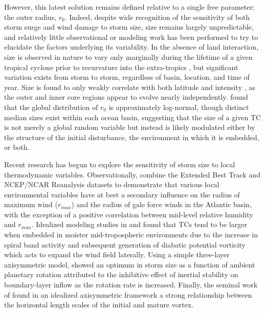\documentclass[12pt]{article}
\begin{document}
However, this latest solution remains defined relative to a single free parameter: the outer radius, $r_0$. Indeed, despite wide recognition of the sensitivity of both storm surge \citep{Irish_Resio_Ratcliff_2008} and wind damage \citep{Iman_Johnson_Watson_2005} to storm size, size remains largely unpredictable, and relatively little observational or modeling work has been performed to try to elucidate the factors underlying its variability. In the absence of land interaction, size is observed in nature to vary only marginally during the lifetime of a given tropical cyclone prior to recurvature into the extra-tropics \citep{Merrill_1984, Frank_1977, Chavas_Emanuel_2010, Cheng-Shang_Cheung_Wei-Ting_Elsberry_2010}, but significant variation exists from storm to storm, regardless of basin, location, and time of year.  Size is found to only weakly correlate with both latitude and intensity \citep{Merrill_1984, Weatherford_Gray_1988, Chavas_Emanuel_2010}, as the outer and inner core regions appear to evolve nearly independently.  \cite{Chavas_Emanuel_2010} found that the global distribution of $r_0$ is approximately log-normal, though distinct median sizes exist within each ocean basin, suggesting that the size of a given TC is not merely a global random variable but instead is likely modulated either by the structure of the initial disturbance, the environment in which it is embedded, or both.

Recent research has begun to explore the sensitivity of storm size to local thermodynamic variables. Observationally, \cite{Quiring_Schumacher_Labosier_Zhu_2011} combine the Extended Best Track and NCEP/NCAR Reanalysis datasets to demonstrate that various local environmental variables have at best a secondary influence on the radius of maximum wind ($r_{max}$) and the radius of gale force winds in the Atlantic basin, with the exception of a positive correlation between mid-level relative humidity and $r_{max}$.  Idealized modeling studies in \cite{Hill_Lackmann_2009} and \cite{Xu_Wang_2010} found that TCs tend to be larger when embedded in moister mid-tropospheric environments due to the increase in spiral band activity and subsequent generation of diabatic potential vorticity which acts to expand the wind field laterally. Using a simple three-layer axisymmetric model, \cite{Smith_Schmidt_Montgomery_2011} showed an optimum in storm size as a function of ambient planetary rotation attributed to the inhibitive effect of inertial stability on boundary-layer inflow as the rotation rate is increased.  Finally, the seminal work of \cite{Rotunno_Emanuel_1987} found in an idealized axisymmetric framework a strong relationship between the horizontal length scales of the initial and mature vortex.
\end{document}
